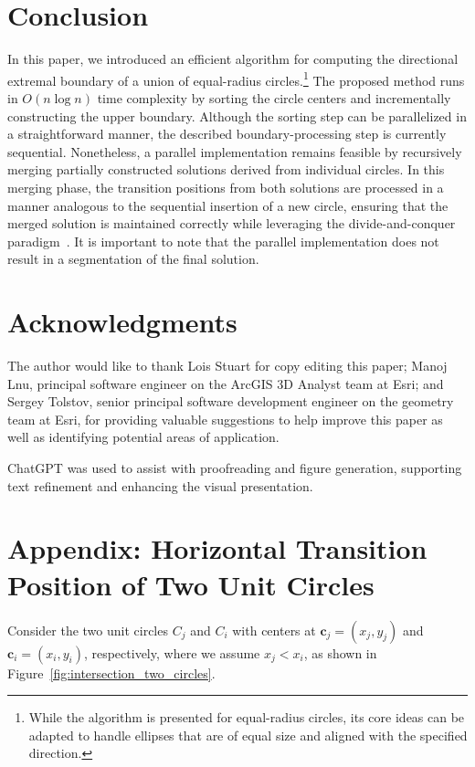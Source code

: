 \documentclass[12pt]{article}
\newcommand{\myvector}[1]{{\boldsymbol{\mathbf{ #1 }}}}
\begin{document}
\section{Conclusion}

In this paper, we introduced an efficient algorithm for computing the directional extremal boundary of a union of equal-radius circles.\footnote{While the algorithm is presented for equal-radius circles, its core ideas can be adapted to handle ellipses that are of equal size and aligned with the specified direction.} The proposed method runs in \(O(n \log n)\) time complexity by sorting the circle centers and incrementally constructing the upper boundary. Although the sorting step can be parallelized in a straightforward manner, the described boundary-processing step is currently sequential. Nonetheless, a parallel implementation remains feasible by recursively merging partially constructed solutions derived from individual circles. In this merging phase, the transition positions from both solutions are processed in a manner analogous to the sequential insertion of a new circle, ensuring that the merged solution is maintained correctly while leveraging the divide-and-conquer paradigm~\cite{Knuth}. It is important to note that the parallel implementation does not result in a segmentation of the final solution.

\section*{Acknowledgments}

The author would like to thank Lois Stuart for copy editing this paper; Manoj Lnu, principal software engineer on the ArcGIS $3$D Analyst team at Esri; and Sergey Tolstov, senior principal software development engineer on the geometry team at Esri, for providing valuable suggestions to help improve this paper as well as identifying potential areas of application.

ChatGPT was used to assist with proofreading and figure generation, supporting text refinement and enhancing the visual presentation.\cite{openaichatgpt}

\section*{Appendix: Horizontal Transition Position of Two Unit Circles}
\label{sec:horizontal_transition_position}

Consider the two unit circles \( C_j \) and \( C_i \) with centers at \( \myvector{c}_j = (x_j, y_j) \) and \( \myvector{c}_i = (x_i, y_i) \), respectively, where we assume \( x_j < x_i \), as shown in Figure~\ref{fig:intersection_two_circles}.
\end{document}
